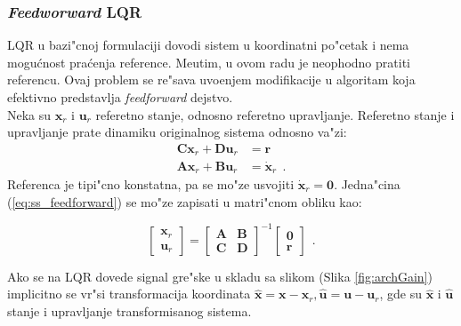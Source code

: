 \documentclass[a4paper,11pt]{article}
\theoremstyle{definition} \newtheorem{deff}{Definicija}[section]
\theoremstyle{definition} \newtheorem{prim}[deff]{Primer}
\theoremstyle{plain} \newtheorem{teor}[deff]{Teorema}
\newcommand{\vect}[1]{\boldsymbol{\mathbf{#1}}}
\begin{document}
	\subsubsection{\emph{Feedworward} LQR}
	LQR u bazi"cnoj formulaciji dovodi sistem u koordinatni po"cetak i nema mogu\'cnost pra\'cenja reference. Me\dj utim, u ovom radu je neophodno pratiti referencu. Ovaj problem se re"sava uvo\dj enjem modifikacije u algoritam koja efektivno predstavlja \emph{feedforward} dejstvo.\\
	
	Neka su $\vect{x}_r$ i $\vect{u}_r$ referetno stanje, odnosno referetno upravljanje. Referetno stanje i upravljanje prate dinamiku originalnog sistema odnosno va"zi:
	\begin{align}\label{eq:ss_feedforward}
		\vect{C}\vect{x}_r + \vect{D}\vect{u}_r &= \vect{r}\\
		\vect{A}\vect{x}_r + \vect{B}\vect{u}_r &= \dot{\vect{x}}_r~~.
	\end{align}
	Referenca je tipi"cno konstatna, pa se mo"ze usvojiti  $\dot{\vect{x}}_r = \vect{0}$. Jedna"cina (\ref{eq:ss_feedforward}) se mo"ze zapisati u matri"cnom obliku kao:

	
	
	\begin{equation}\label{eq:ss_ff_matrix}
		\begin{bmatrix} \vect{x}_r \\  \vect{u}_r \end{bmatrix} = 
		\begin{bmatrix} \vect{A} &  \vect{B} \\  \vect{C} &  \vect{D} \end{bmatrix}^{-1}
		\begin{bmatrix} \vect{0} \\  \vect{r} \end{bmatrix}~~.
	\end{equation} \vspace{1cm}
	
	Ako se na LQR dovede signal gre"ske u skladu sa slikom (Slika \ref{fig:archGain}) implicitno se vr"si transformacija koordinata $\hat{\vect{x}} = \vect{x} - \vect{x}_r, \hat{\vect{u}} = \vect{u} - \vect{u}_r$, gde su $\hat{\vect{x}}$ i $\hat{\vect{u}}$ stanje i upravljanje transformisanog sistema.
	
\end{document}
